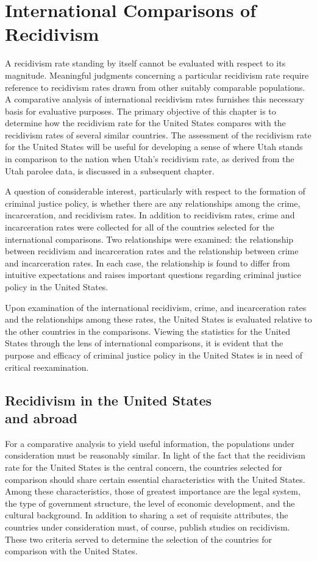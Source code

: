 \chapter{International Comparisons of Recidivism}

A recidivism rate standing by itself cannot be evaluated with respect to its magnitude.  Meaningful judgments concerning a particular recidivism rate require reference to recidivism rates drawn from other suitably comparable populations.  A comparative analysis of international recidivism rates furnishes this necessary basis for evaluative purposes.  The primary objective of this chapter is to determine how the recidivism rate for the United States compares with the recidivism rates of several similar countries.  The assessment of the recidivism rate for the United States will be useful for developing a sense of where Utah stands in comparison to the nation when Utah's recidivism rate, as derived from the Utah parolee data, is discussed in a subsequent chapter.

A question of considerable interest, particularly with respect to the formation of criminal justice policy, is whether there are any relationships among the crime, incarceration, and recidivism rates.  In addition to recidivism rates, crime and incarceration rates were collected for all of the countries selected for the international comparisons.  Two relationships were examined:  the relationship between recidivism and incarceration rates and the relationship between crime and incarceration rates.  In each case, the relationship is found to differ from intuitive expectations and raises important questions regarding criminal justice policy in the United States.

Upon examination of the international recidivism, crime, and incarceration rates and the relationships among these rates, the United States is evaluated relative to the other countries in the comparisons.  Viewing the statistics for the United States through the lens of international comparisons, it is evident that the purpose and efficacy of criminal justice policy in the United States is in need of critical reexamination.

\section[Recidivism in the United States and abroad]{Recidivism in the United States\\ and abroad}

For a comparative analysis to yield useful information, the populations under consideration must be reasonably similar.  In light of the fact that the recidivism rate for the United States is the central concern, the countries selected for comparison should share certain essential characteristics with the United States.  Among these characteristics, those of greatest importance are the legal system, the type of government structure, the level of economic development, and the cultural background.  In addition to sharing a set of requisite attributes, the countries under consideration must, of course, publish studies on recidivism.  These two criteria served to determine the selection of the countries for comparison with the United States.

